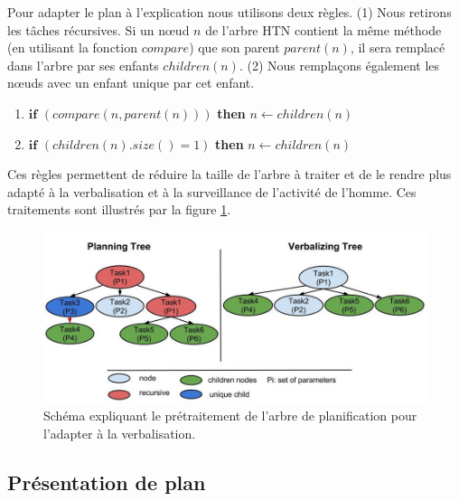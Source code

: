 \documentclass[a4paper,11pt,twoside]{StyleThese}
\begin{document}
 Pour adapter le plan à l'explication nous utilisons deux règles.
%
(1) Nous retirons les tâches récursives. Si un nœud $n$ de l'arbre HTN contient la même méthode (en utilisant la fonction $compare$) que son parent $parent(n)$, il sera remplacé dans l'arbre par ses enfants $children(n)$. (2) Nous remplaçons également les nœuds avec un enfant unique par cet enfant.
\begin{enumerate}
\item $\textbf{if}$ $(compare(n, parent(n)))$ \textbf{then} $n \leftarrow children(n)$
\item $\textbf{if}$ $(children(n).size() = 1)$ \textbf{then} $n \leftarrow children(n)$
\end{enumerate}
Ces règles permettent de réduire la taille de l'arbre à traiter et de le rendre plus adapté à la verbalisation et à la surveillance de l'activité de l'homme.
Ces traitements sont illustrés par la figure \ref{fig:pretraitement}.

\begin{figure}[ht!]
 \centering
  \includegraphics[width=0.99 \textwidth]{img/rules2.jpg}
 \caption{Schéma expliquant le prétraitement de l'arbre de planification pour l'adapter à la verbalisation.}
 \label{fig:pretraitement}
 \end{figure}

\subsection{Présentation de plan}
\end{document}
